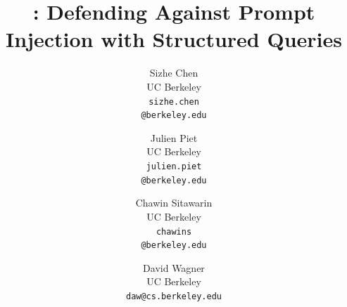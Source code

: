 \title{\Large \bf \frameworkname: Defending Against Prompt Injection with Structured Queries}


\author{
{\rm Sizhe Chen}\\
UC Berkeley\\
\texttt{sizhe.chen}\\\texttt{@berkeley.edu}
\and
{\rm Julien Piet}\\
UC Berkeley\\
\texttt{julien.piet}\\\texttt{@berkeley.edu}
\and
{\rm Chawin Sitawarin}\\
UC Berkeley\\
\texttt{chawins}\\\texttt{@berkeley.edu}
\and
{\rm David Wagner}\\
UC Berkeley\\
\texttt{daw@cs.berkeley.edu}
} %



















